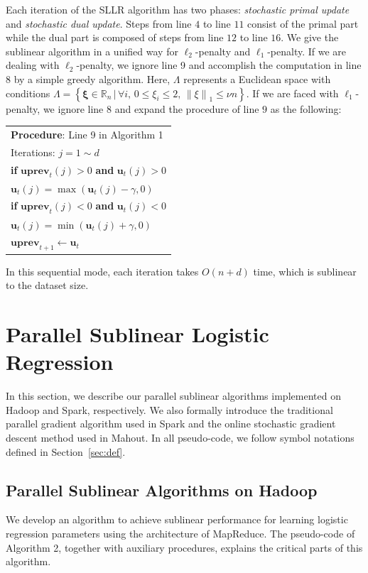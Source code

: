 \documentclass[10pt, conference, compsocconf]{IEEEtran}
\newcommand{\bu}{\mathbf{u}}
\newcommand{\buprev}{\mathbf{uprev}}
\newcommand{\bxi}{\mathbf{\xi}}
\newcommand{\lc}{\left(}
\newcommand{\rc}{\right)}
\newcommand{\lj}{\lc j\rc}
\newcommand{\tspace}{\hspace*{2em}}
\begin{document}
Each iteration of the SLLR algorithm has two phases: \textit{stochastic primal update} and \textit{stochastic dual update}.
Steps from line $4$ to line $11$ consist of the primal part while the dual part is composed of steps from line $12$ to line $16$.
We give the sublinear algorithm in a unified way for $\ell_2$-penalty and $\ell_1$-penalty.
If we are dealing with $\ell_2$-penalty, we ignore line 9 and accomplish the computation in line 8 by a simple greedy algorithm.
Here, $\Lambda$ represents a Euclidean space with conditions $
\Lambda=\left\{ \bxi\in\mathbb{R}_{n} \, | \, \forall i, \, 0\leq{\xi}_{i}\leq 2, \, {\|\xi \|}_{1}\leq \nu n  \right
\}$.
If we are faced with $\ell_1$-penalty, we ignore line $8$ and expand the procedure of line $9$ as the following:

\begin{table} [ht]
\begin{tabular}{l}
\hline\noalign{\smallskip}
\textbf{Procedure}: Line 9 in Algorithm 1\\
\noalign{\smallskip}
\hline
\noalign{\smallskip}
Iterations: $j=1 \sim d$ \\
\tspace \textbf{if} $\buprev_t\lj>0$ \textbf{and} $\bu_t\lj>0$ \\
\tspace\tspace $\bu_t\lj=\max \lc \bu_t\lj-\gamma ,0 \rc$ \\
\tspace \textbf{if} $\buprev_t\lj<0$ \textbf{and} $\bu_t\lj<0$ \\
\tspace\tspace $\bu_t\lj=\min \lc \bu_t\lj+\gamma ,0 \rc$ \\
$\buprev_{t+1}\leftarrow\bu_t$ \\
\hline
\end{tabular}
\end{table}

In this sequential mode, each iteration takes $O(n+d)$ time, which is sublinear to the dataset size.

\section{Parallel Sublinear Logistic Regression} \label{sec:framework}
In this section, we describe our parallel sublinear algorithms implemented on Hadoop and Spark, respectively.
We also formally introduce the traditional parallel gradient algorithm used in Spark and the online stochastic gradient descent method used in Mahout.
In all pseudo-code, we follow symbol notations defined in Section~\ref{sec:def}.
\subsection{Parallel Sublinear Algorithms on Hadoop}
We develop an algorithm to achieve sublinear performance for learning logistic regression parameters using the architecture of MapReduce.
The pseudo-code of Algorithm 2, together with auxiliary procedures, explains the critical parts of this algorithm.
\end{document}
